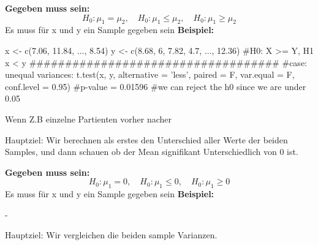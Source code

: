 \large{\textbf{Gegeben muss sein:}}
\[
H_0: \mu_1 = \mu_2, \quad 
H_0: \mu_1 \leq \mu_2, \quad 
H_0: \mu_1 \geq \mu_2
\]
\textcolor{red}{\warning} Es muss für x und y ein Sample gegeben sein \textcolor{red}{\warning}
\large{\textbf{Beispiel:}}
\begin{rcode}{1}
x <- c(7.06, 11.84, ..., 8.54)
y <- c(8.68, 6, 7.82, 4.7, ..., 12.36)
#H0: X >= Y, H1 x < y
###################################
#case: unequal variances:
t.test(x, y, alternative = 'less', paired = F, var.equal = F, conf.level = 0.95)
#p-value = 0.01596
#we can reject the h0 since we are under 0.05
\end{rcode}

\columnbreak
\begin{center}
    
\end{center}
\textcolor{red}{\warning}Wenn Z.B einzelne Partienten vorher nacher\textcolor{red}{\warning}

\normalsize
Hauptziel: Wir berechnen als erstes den Unterschied aller Werte der beiden Samples, und dann schauen ob der Mean signifikant Unterschiedlich von 0 ist.
\normalsize
\begin{center}
\end{center}

\large{\textbf{Gegeben muss sein:}}
\[
H_0: \mu_1 = 0, \quad 
H_0: \mu_1 \leq 0, \quad 
H_0: \mu_1 \geq 0
\]
\textcolor{red}{\warning} Es muss für x und y ein Sample gegeben sein \textcolor{red}{\warning}
\large{\textbf{Beispiel:}}

-

\begin{center}
    
\end{center}
\normalsize
Hauptziel: Wir vergleichen die beiden sample Varianzen.
\normalsize
\begin{center}
\end{center}

